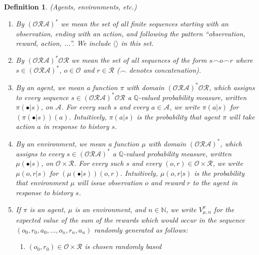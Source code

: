 \documentclass[runningheads]{llncs}
\newtheorem{mydefinition}[mytheorem]{Definition}
\begin{document}
\begin{mydefinition}
\label{omnibusdefn}
    (Agents, environments, etc.)
    \begin{enumerate}
        \item
        By $(\mathcal O\mathcal R\mathcal A)^*$ we mean the set of
        all finite sequences starting with an observation, ending with an action,
        and following the pattern ``observation, reward, action, ...''.
        We include $\langle\rangle$ in this set.
        \item
        By $(\mathcal O\mathcal R\mathcal A)^* \mathcal O\mathcal R$
        we mean the set of all sequences of the form $s\frown o\frown r$ where
        $s\in (\mathcal O\mathcal R\mathcal A)^*$, $o\in\mathcal O$
        and $r\in\mathcal R$ ($\frown$ denotes concatenation).
        \item
        By an \emph{agent}, we mean a function $\pi$
        with domain $(\mathcal O\mathcal R\mathcal A)^* \mathcal O\mathcal R$,
        which assigns to every sequence
        $s\in (\mathcal O\mathcal R\mathcal A)^* \mathcal O\mathcal R$ a
        $\mathbb Q$-valued probability measure,
        written $\pi(\bullet|s)$, on $\mathcal A$.
        For every such $s$ and every $a\in\mathcal A$,
        we write $\pi(a|s)$ for $(\pi(\bullet|s))(a)$.
        Intuitively, $\pi(a|s)$ is the probability that agent $\pi$
        will take action $a$ in response to history $s$.
        \item
        By an \emph{environment}, we mean a function $\mu$
        with domain $(\mathcal O\mathcal R\mathcal A)^*$,
        which assigns to every
        $s\in (\mathcal O\mathcal R\mathcal A)^*$
        a $\mathbb Q$-valued probability measure,
        written $\mu(\bullet|s)$,
        on $\mathcal O\times\mathcal R$.
        For every such $s$ and every $(o,r)\in\mathcal O\times\mathcal R$,
        we write $\mu(o,r|s)$ for $(\mu(\bullet|s))(o,r)$.
        Intuitively, $\mu(o,r|s)$ is the probability that environment
        $\mu$ will issue observation $o$ and reward $r$ to the agent in response
        to history $s$.
        \item
        If $\pi$ is an agent, $\mu$ is an environment, and $n\in\mathbb N$,
        we write $V^\pi_{\mu,n}$ for the expected value of the sum of
        the rewards which would occur in the sequence
        $(o_0,r_0,a_0,\ldots,o_n,r_n,a_n)$ randomly generated as follows:
        \begin{enumerate}
            \item $(o_0,r_0)\in \mathcal O\times\mathcal R$ is chosen randomly based

\end{enumerate}
\end{enumerate}
\end{mydefinition}
\end{document}
